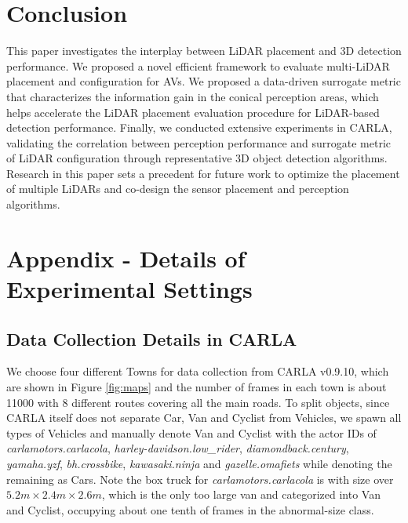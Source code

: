 \documentclass[10pt,twocolumn,letterpaper]{article}
\begin{document}


\section{Conclusion}
\label{conclusion}

This paper investigates the interplay between LiDAR placement and 3D detection performance. We proposed a novel efficient framework to evaluate multi-LiDAR placement and configuration for AVs.
We proposed a data-driven surrogate metric that characterizes the information gain in the conical perception areas, which helps accelerate the LiDAR placement evaluation procedure for LiDAR-based detection performance. Finally, we conducted extensive experiments in CARLA, validating the correlation between perception performance and surrogate metric of LiDAR configuration through representative 3D object detection algorithms.
Research in this paper sets a precedent for future work to optimize the placement of multiple LiDARs and co-design the sensor placement and perception algorithms.


{\small


}
\clearpage
\appendix
\section{Appendix - Details of Experimental Settings}
\label{sec:app}
\subsection{Data Collection Details in CARLA}
We choose four different Towns for data collection from CARLA v0.9.10, which are shown in Figure \ref{fig:maps} and the number of frames in each town is about 11000 with 8 different routes covering all the main roads. To split objects, since CARLA itself does not separate Car, Van and Cyclist from Vehicles, we spawn all types of Vehicles and manually denote Van and Cyclist with the actor IDs of \textit{carlamotors.carlacola}, \textit{harley-davidson.low\_rider}, \textit{diamondback.century}, \textit{yamaha.yzf}, \textit{bh.crossbike}, \textit{kawasaki.ninja}  and \textit{gazelle.omafiets} while denoting the remaining as Cars. Note the box truck for \textit{carlamotors.carlacola} is with size over $5.2m \times 2.4m \times 2.6m$, which is the only too large van and categorized into Van and Cyclist, occupying about one tenth of frames in the abnormal-size class.
\end{document}
